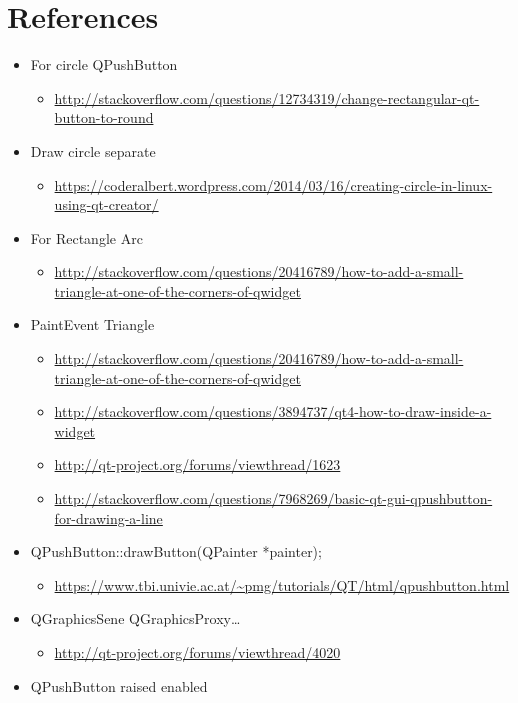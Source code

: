 \documentclass[9pt,b5paper]{article}
\begin{document}
\section{References}
\label{sec-11}
\begin{itemize}
\item For circle QPushButton
\begin{itemize}
\item \url{http://stackoverflow.com/questions/12734319/change-rectangular-qt-button-to-round}
\end{itemize}
\item Draw circle separate
\begin{itemize}
\item \url{https://coderalbert.wordpress.com/2014/03/16/creating-circle-in-linux-using-qt-creator/}
\end{itemize}
\item For Rectangle Arc
\begin{itemize}
\item \url{http://stackoverflow.com/questions/20416789/how-to-add-a-small-triangle-at-one-of-the-corners-of-qwidget}
\end{itemize}
\item PaintEvent Triangle
\begin{itemize}
\item \url{http://stackoverflow.com/questions/20416789/how-to-add-a-small-triangle-at-one-of-the-corners-of-qwidget}
\item \url{http://stackoverflow.com/questions/3894737/qt4-how-to-draw-inside-a-widget}
\item \url{http://qt-project.org/forums/viewthread/1623}
\item \url{http://stackoverflow.com/questions/7968269/basic-qt-gui-qpushbutton-for-drawing-a-line}
\end{itemize}
\item QPushButton::drawButton(QPainter *painter);
\begin{itemize}
\item \url{https://www.tbi.univie.ac.at/~pmg/tutorials/QT/html/qpushbutton.html}
\end{itemize}
\item QGraphicsSene QGraphicsProxy\ldots{}
\begin{itemize}
\item \url{http://qt-project.org/forums/viewthread/4020}
\end{itemize}
\item QPushButton raised enabled
\begin{itemize}

\end{itemize}
\end{itemize}
\end{document}
